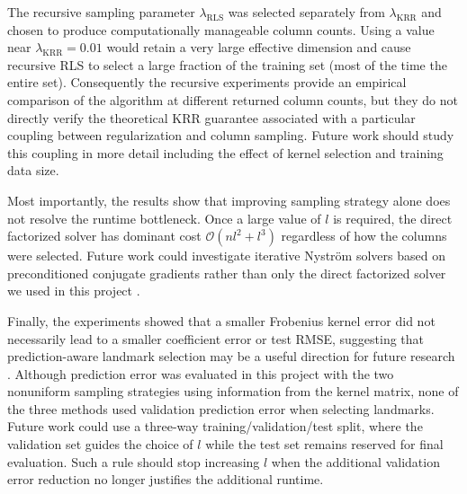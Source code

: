 The recursive sampling parameter $\lambda_{\mathrm{RLS}}$ was selected separately from $\lambda_{\mathrm{KRR}}$ and chosen to produce computationally manageable column counts. Using a value near $\lambda_{\mathrm{KRR}}=0.01$ would retain a very large effective dimension and cause recursive RLS to select a large fraction of the training set (most of the time the entire set). Consequently the recursive experiments provide an empirical comparison of the algorithm at different returned column counts, but they do not directly verify the theoretical KRR guarantee associated with a particular coupling between regularization and column sampling. Future work should study this coupling in more detail including the effect of kernel selection and training data size.

Most importantly, the results show that improving sampling strategy alone does not resolve the runtime bottleneck. Once a large value of $l$ is required, the direct factorized solver has dominant cost $\mathcal{O}(nl^2+l^3)$ regardless of how the columns were selected. Future work could investigate iterative Nystr\"om solvers based on preconditioned conjugate gradients rather than only the direct factorized solver we used in this project \citep{rudi2017falkon}.

Finally, the experiments showed that a smaller Frobenius kernel error did not necessarily lead to a smaller coefficient error or test RMSE, suggesting that prediction-aware landmark selection may be a useful direction for future research \citep{cortes2010impact,alaoui2015fast}. Although prediction error was evaluated in this project with the two nonuniform sampling strategies using information from the kernel matrix, none of the three methods used validation prediction error when selecting landmarks. Future work could use a three-way training/validation/test split, where the validation set guides the choice of $l$ while the test set remains reserved for final evaluation. Such a rule should stop increasing $l$ when the additional validation error reduction no longer justifies the additional runtime.